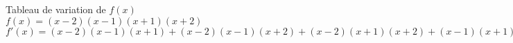 \documentclass{article}
\begin{document}
Tableau de variation de $f(x)$\\
                   
$f(x)=\left(x - 2\right) \left(x - 1\right) \left(x + 1\right) \left(x + 2\right)$\\
$f'(x)=\left(x - 2\right) \left(x - 1\right) \left(x + 1\right) + \left(x - 2\right) \left(x - 1\right) \left(x + 2\right) + \left(x - 2\right) \left(x + 1\right) \left(x + 2\right) + \left(x - 1\right) \left(x + 1\right) \left(x + 2\right)$\\

\end{document}
